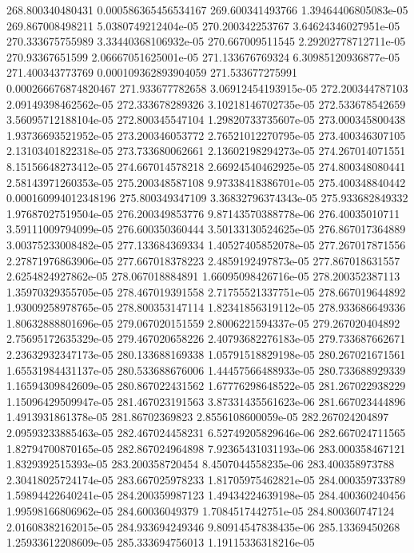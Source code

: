 {268.800340480431 0.000586365456534167
269.600341493766 1.39464406805083e-05
269.867008498211 5.0380749212404e-05
270.200342253767 3.64624346027951e-05
270.333675755989 3.33440368106932e-05
270.667009511545 2.29202778712711e-05
270.93367651599 2.06667051625001e-05
271.133676769324 6.30985120936877e-05
271.400343773769 0.000109362893904059
271.533677275991 0.000266676874820467
271.933677782658 3.06912454193915e-05
272.200344787103 2.09149398462562e-05
272.333678289326 3.10218146702735e-05
272.533678542659 3.56095712188104e-05
272.800345547104 1.29820733735607e-05
273.000345800438 1.93736693521952e-05
273.200346053772 2.76521012270795e-05
273.400346307105 2.13103401822318e-05
273.733680062661 2.13602198294273e-05
274.267014071551 8.15156648273412e-05
274.667014578218 2.66924540462925e-05
274.800348080441 2.58143971260353e-05
275.200348587108 9.97338418386701e-05
275.400348840442 0.000160994012348196
275.800349347109 3.36832796374343e-05
275.933682849332 1.97687027519504e-05
276.200349853776 9.87143570388778e-06
276.40035010711 3.59111009794099e-05
276.600350360444 3.50133130524625e-05
276.867017364889 3.00375233008482e-05
277.133684369334 1.40527405852078e-05
277.267017871556 2.27871976863906e-05
277.667018378223 2.4859192497873e-05
277.867018631557 2.6254824927862e-05
278.067018884891 1.66095098426716e-05
278.200352387113 1.35970329355705e-05
278.467019391558 2.71755521337751e-05
278.667019644892 1.93009258978765e-05
278.800353147114 1.82341856319112e-05
278.933686649336 1.80632888801696e-05
279.067020151559 2.8006221594337e-05
279.267020404892 2.75695172635329e-05
279.467020658226 2.40793682276183e-05
279.733687662671 2.23632932347173e-05
280.133688169338 1.05791518829198e-05
280.267021671561 1.65531984431137e-05
280.533688676006 1.44457566488933e-05
280.733688929339 1.16594309842609e-05
280.867022431562 1.67776298648522e-05
281.267022938229 1.15096429509947e-05
281.467023191563 3.87331435561623e-06
281.667023444896 1.4913931861378e-05
281.86702369823 2.8556108600059e-05
282.267024204897 2.09593233885463e-05
282.467024458231 6.52749205829646e-06
282.667024711565 1.82794700870165e-05
282.867024964898 7.92365431031193e-06
283.000358467121 1.8329392515393e-05
283.200358720454 8.4507044558235e-06
283.400358973788 2.30418025724174e-05
283.667025978233 1.81705975462821e-05
284.000359733789 1.59894422640241e-05
284.200359987123 1.49434224639198e-05
284.400360240456 1.99598166806962e-05
284.60036049379 1.7084517442751e-05
284.800360747124 2.01608382162015e-05
284.933694249346 9.80914547838435e-06
285.13369450268 1.25933612208609e-05
285.333694756013 1.19115336318216e-05
}
